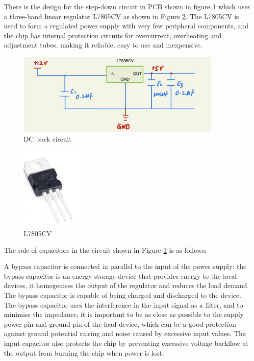 \documentclass[12pt, a4paper, oneside]{report}
\begin{document}
There is the design for the step-down circuit in PCB shown in figure \ref{fig:mt11} which uses a three-band linear regulator L7805CV as shown in Figure \ref{fig:mt12}. The L7805CV is used to form a regulated power supply with very few peripheral components, and the chip has internal protection circuits for overcurrent, overheating and adjustment tubes, making it reliable, easy to use and inexpensive.

\begin{figure}[H]
  \centering
  \includegraphics[width=0.9\textwidth]{pic/Motor Drive/21.png}
  \caption{DC buck circuit}
  \label{fig:mt11}
\end{figure}

\begin{figure}[H]
  \centering
  \includegraphics[width=0.3\textwidth]{pic/Motor Drive/22.jpg}
  \caption{L7805CV}
  \label{fig:mt12}
\end{figure}

The role of capacitors in the circuit shown in Figure \ref{fig:mt11} is as follows:

A bypass capacitor is connected in parallel to the input of the power supply: the bypass capacitor is an energy storage device that provides energy to the local devices, it homogenises the output of the regulator and reduces the load demand. The bypass capacitor is capable of being charged and discharged to the device. The bypass capacitor uses the interference in the input signal as a filter, and to minimise the impedance, it is important to be as close as possible to the supply power pin and ground pin of the load device, which can be a good protection against ground potential raising and noise caused by excessive input values. The input capacitor also protects the chip by preventing excessive voltage backflow at the output from burning the chip when power is lost.
\end{document}
